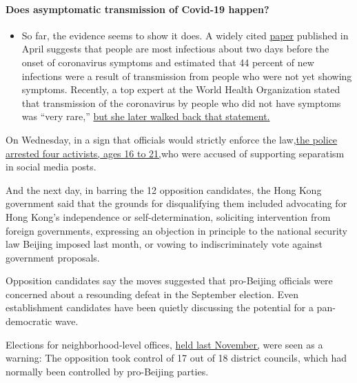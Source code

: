 \begin{itemize}
{  \paragraph{Does asymptomatic transmission of Covid-19
  happen?}\label{does-asymptomatic-transmission-of-covid-19-happen}}

  \begin{itemize}
  \tightlist
  \item
    So far, the evidence seems to show it does. A widely cited
    \href{https://www.nature.com/articles/s41591-020-0869-5}{paper}
    published in April suggests that people are most infectious about
    two days before the onset of coronavirus symptoms and estimated that
    44 percent of new infections were a result of transmission from
    people who were not yet showing symptoms. Recently, a top expert at
    the World Health Organization stated that transmission of the
    coronavirus by people who did not have symptoms was ``very rare,''
    \href{https://www.nytimes.com/2020/06/09/world/coronavirus-updates.html?action=click\&pgtype=Article\&state=default\&region=MAIN_CONTENT_3\&context=storylines_faq\#link-1f302e21}{but
    she later walked back that statement.}
  \end{itemize}
\end{itemize}

On Wednesday, in a sign that officials would strictly enforce the
law,\href{https://www.nytimes.com/2020/07/29/world/asia/hong-kong-arrests-security-law.html}{the
police arrested four activists, ages 16 to 21,}who were accused of
supporting separatism in social media posts.

And the next day, in barring the 12 opposition candidates, the Hong Kong
government said that the grounds for disqualifying them included
advocating for Hong Kong's independence or self-determination,
soliciting intervention from foreign governments, expressing an
objection in principle to the national security law Beijing imposed last
month, or vowing to indiscriminately vote against government proposals.

Opposition candidates say the moves suggested that pro-Beijing officials
were concerned about a resounding defeat in the September election. Even
establishment candidates have been quietly discussing the potential for
a pan-democratic wave.

Elections for neighborhood-level offices,
\href{https://www.nytimes.com/2019/11/24/world/asia/hong-kong-election-results.html}{held
last November,} were seen as a warning: The opposition took control of
17 out of 18 district councils, which had normally been controlled by
pro-Beijing parties.

